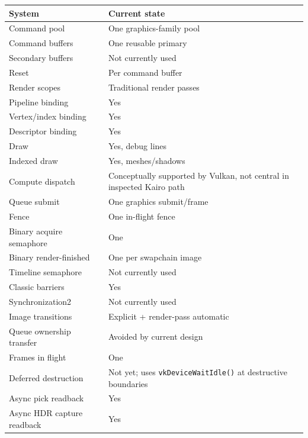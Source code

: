{\def\LTcaptype{none} %
\begin{longtable}[]{@{}
  >{\raggedright\arraybackslash}p{}
  >{\raggedright\arraybackslash}p{}@{}}
\toprule\noalign{}
\begin{minipage}[b]{\linewidth}\raggedright
System
\end{minipage} & \begin{minipage}[b]{\linewidth}\raggedright
Current state
\end{minipage} \\
\midrule\noalign{}
\endhead
\bottomrule\noalign{}
\endlastfoot
Command pool & One graphics-family pool \\
Command buffers & One reusable primary \\
Secondary buffers & Not currently used \\
Reset & Per command buffer \\
Render scopes & Traditional render passes \\
Pipeline binding & Yes \\
Vertex/index binding & Yes \\
Descriptor binding & Yes \\
Draw & Yes, debug lines \\
Indexed draw & Yes, meshes/shadows \\
Compute dispatch & Conceptually supported by Vulkan, not central in inspected Kairo path \\
Queue submit & One graphics submit/frame \\
Fence & One in-flight fence \\
Binary acquire semaphore & One \\
Binary render-finished & One per swapchain image \\
Timeline semaphore & Not currently used \\
Classic barriers & Yes \\
Synchronization2 & Not currently used \\
Image transitions & Explicit + render-pass automatic \\
Queue ownership transfer & Avoided by current design \\
Frames in flight & One \\
Deferred destruction & Not yet; uses \texttt{vkDeviceWaitIdle()} at destructive boundaries \\
Async pick readback & Yes \\
Async HDR capture readback & Yes \\

\end{longtable}}
